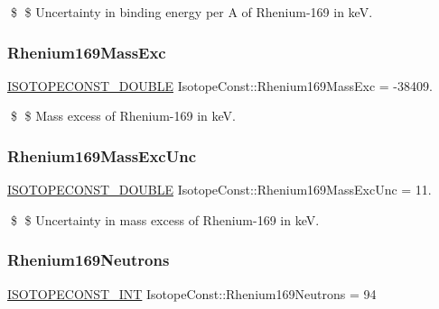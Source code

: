 \$ \$ Uncertainty in binding energy per A of Rhenium-\/169 in keV. \mbox{\label{group___isotope_const-_rhenium-_re169_gaf11b8ba996ca7f6eead886d59819a20d}} 
\subsubsection{\texorpdfstring{Rhenium169\+Mass\+Exc}{Rhenium169MassExc}}
{\footnotesize\ttfamily \mbox{\hyperlink{group___isotope_const-_macros_ga8f45a7272ce02c0b4c65c44636ed719a}{I\+S\+O\+T\+O\+P\+E\+C\+O\+N\+S\+T\+\_\+\+D\+O\+U\+B\+LE}} Isotope\+Const\+::\+Rhenium169\+Mass\+Exc = -\/38409.}

\$ \$ Mass excess of Rhenium-\/169 in keV. \mbox{\label{group___isotope_const-_rhenium-_re169_ga1f9f0fd59c60a8576628ab2840b42ebf}} 
\subsubsection{\texorpdfstring{Rhenium169\+Mass\+Exc\+Unc}{Rhenium169MassExcUnc}}
{\footnotesize\ttfamily \mbox{\hyperlink{group___isotope_const-_macros_ga8f45a7272ce02c0b4c65c44636ed719a}{I\+S\+O\+T\+O\+P\+E\+C\+O\+N\+S\+T\+\_\+\+D\+O\+U\+B\+LE}} Isotope\+Const\+::\+Rhenium169\+Mass\+Exc\+Unc = 11.}

\$ \$ Uncertainty in mass excess of Rhenium-\/169 in keV. \mbox{\label{group___isotope_const-_rhenium-_re169_gaa3ccc492a8557445bbef1799ce61736b}} 
\subsubsection{\texorpdfstring{Rhenium169\+Neutrons}{Rhenium169Neutrons}}
{\footnotesize\ttfamily \mbox{\hyperlink{group___isotope_const-_macros_ga5f18360b3e99483a35c32d789e62621c}{I\+S\+O\+T\+O\+P\+E\+C\+O\+N\+S\+T\+\_\+\+I\+NT}} Isotope\+Const\+::\+Rhenium169\+Neutrons = 94}

